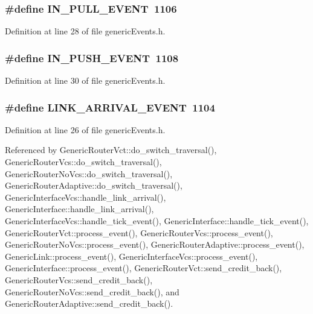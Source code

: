 \subsubsection[{IN\_\-PULL\_\-EVENT}]{\setlength{\rightskip}{0pt plus 5cm}\#define IN\_\-PULL\_\-EVENT~1106}\label{genericEvents_8h_b9da31e40eeed811fb2326ccf7d5b5b0}




Definition at line 28 of file genericEvents.h.
\subsubsection[{IN\_\-PUSH\_\-EVENT}]{\setlength{\rightskip}{0pt plus 5cm}\#define IN\_\-PUSH\_\-EVENT~1108}\label{genericEvents_8h_02779e6bd5359103f922ac67676fb9c6}




Definition at line 30 of file genericEvents.h.
\subsubsection[{LINK\_\-ARRIVAL\_\-EVENT}]{\setlength{\rightskip}{0pt plus 5cm}\#define LINK\_\-ARRIVAL\_\-EVENT~1104}\label{genericEvents_8h_b2b8082b7fc124118b58c05e786f2697}




Definition at line 26 of file genericEvents.h.

Referenced by GenericRouterVct::do\_\-switch\_\-traversal(), GenericRouterVcs::do\_\-switch\_\-traversal(), GenericRouterNoVcs::do\_\-switch\_\-traversal(), GenericRouterAdaptive::do\_\-switch\_\-traversal(), GenericInterfaceVcs::handle\_\-link\_\-arrival(), GenericInterface::handle\_\-link\_\-arrival(), GenericInterfaceVcs::handle\_\-tick\_\-event(), GenericInterface::handle\_\-tick\_\-event(), GenericRouterVct::process\_\-event(), GenericRouterVcs::process\_\-event(), GenericRouterNoVcs::process\_\-event(), GenericRouterAdaptive::process\_\-event(), GenericLink::process\_\-event(), GenericInterfaceVcs::process\_\-event(), GenericInterface::process\_\-event(), GenericRouterVct::send\_\-credit\_\-back(), GenericRouterVcs::send\_\-credit\_\-back(), GenericRouterNoVcs::send\_\-credit\_\-back(), and GenericRouterAdaptive::send\_\-credit\_\-back().
